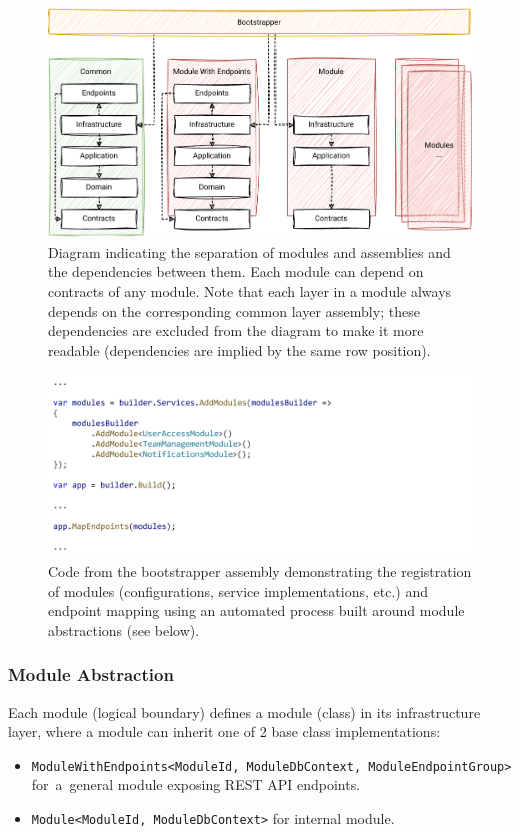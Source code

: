 \begin{figure} [H]
    \centering
    \includegraphics[width=\textwidth]{figures/mm-assemblies.pdf}
        \caption{Diagram indicating the separation of modules and assemblies and the dependencies between them. Each module can depend on contracts of any module. Note that each layer in a module always depends on the corresponding common layer assembly; these dependencies are excluded from the diagram to make it more readable (dependencies are implied by the same row position).}
    \label{fig:mm_assemblies}
\end{figure}

\begin{figure} [H]
    \centering
    \includegraphics[width=\textwidth]{figures/bootstrapper.pdf}
    \caption{Code from the bootstrapper assembly demonstrating the registration of modules (configurations, service implementations, etc.) and endpoint mapping using an automated process built around module abstractions (see below).}
    \label{fig:mm_bootstrapper}
\end{figure}

\subsubsection{Module Abstraction}
Each module (logical boundary) defines a module (class) in its infrastructure layer, where a module can inherit one of 2 base class implementations:
\begin{itemize}
    \item \texttt{ModuleWithEndpoints<ModuleId, ModuleDbContext, ModuleEndpointGroup>} \\for~a~general module exposing REST API endpoints.
    \item \texttt{Module<ModuleId, ModuleDbContext>} for internal module.
\end{itemize}

